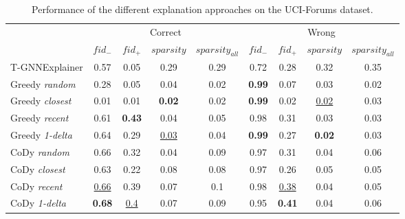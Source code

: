 




\begin{table}[ht]
    \centering
    \begin{tabular}{lcccccccc}
    \hline
         &  \multicolumn{4}{c}{Correct}&  \multicolumn{4}{c}{Wrong}\\
         &  $fid_-$&  $fid_+$&  $sparsity$&  $sparsity_{all}$&  $fid_-$&  $fid_+$&  $sparsity$&  $sparsity_{all}$\\
         \hline
         T-GNNExplainer&     0.57&           0.05&   0.29&           0.29& 0.72&         0.28&       0.32&  0.35\\
         Greedy \textit{random}&     0.28&           0.05&   0.04&           0.02& \textbf{0.99}& 0.07&      0.03&  0.02\\
         Greedy \textit{closest}&    0.01&           0.01&   \textbf{0.02}&  0.02& \textbf{0.99}& 0.02& \underline{0.02}&  0.03\\
         Greedy \textit{recent}&     0.61&  \textbf{0.43}&   0.04&           0.05& 0.98&         0.31&       0.03&  0.03\\
         Greedy \textit{1-delta}&     0.64&           0.29& \underline{0.03}& 0.04& \textbf{0.99}& 0.27&\textbf{0.02}& 0.03\\
         CoDy \textit{random}&       0.66&           0.32&   0.04&           0.09& 0.97&         0.31&       0.04& 0.06\\
         CoDy \textit{closest}&      0.63&           0.22&   0.08&           0.08& 0.97&         0.26&       0.05& 0.05\\
         CoDy \textit{recent}&     \underline{0.66}& 0.39&   0.07&           0.1&  0.98& \underline{0.38}&   0.04& 0.05\\
         CoDy \textit{1-delta}&\textbf{0.68}&\underline{0.4}& 0.07&           0.09& 0.95& \textbf{0.41}&      0.04& 0.06\\
 \hline
    \end{tabular}
    \caption{Performance of the different explanation approaches on the UCI-Forums dataset.}
    \label{t_results_uci_overview}
\end{table}


